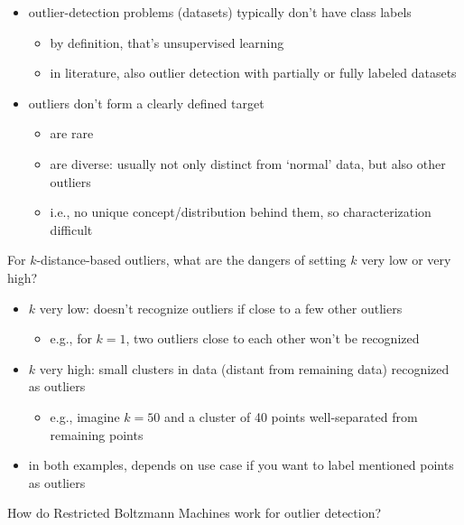 \documentclass[12pt]{article}
\begin{document}
\begin{itemize}[left=0pt, nosep]
	\item outlier-detection problems (datasets) typically don't have class labels
	\begin{itemize}[left=0pt, nosep]
		\item by definition, that's unsupervised learning
		\item in literature, also outlier detection with partially or fully labeled datasets
	\end{itemize}
	\item outliers don't form a clearly defined target
	\begin{itemize}[left=0pt, nosep]
		\item are rare
		\item are diverse: usually not only distinct from `normal' data, but also other outliers
		\item i.e., no unique concept/distribution behind them, so characterization difficult
	\end{itemize}
\end{itemize}

\begin{question}
	For $k$-distance-based outliers, what are the dangers of setting $k$ very low or very high?
\end{question}

\begin{itemize}[left=0pt, nosep]
	\item $k$ very low: doesn't recognize outliers if close to a few other outliers
	\begin{itemize}[left=0pt, nosep]
		\item e.g., for $k=1$, two outliers close to each other won't be recognized
	\end{itemize}
	\item $k$ very high: small clusters in data (distant from remaining data) recognized as outliers
	\begin{itemize}[left=0pt, nosep]
		\item e.g., imagine $k=50$ and a cluster of 40 points well-separated from remaining points
	\end{itemize}
	\item in both examples, depends on use case if you want to label mentioned points as outliers
\end{itemize}

\begin{question}
	How do Restricted Boltzmann Machines work for outlier detection?
\end{question}
\end{document}

